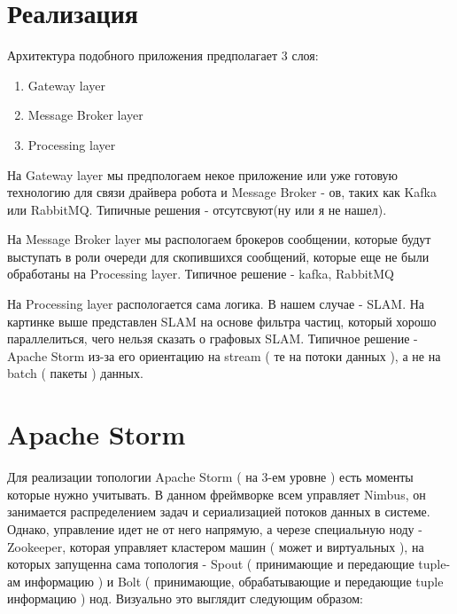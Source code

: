 \documentclass[a4paper, 14pt]{extreport}
\begin{document}
\chapter{Реализация}
\par Архитектура подобного приложения предполагает 3 слоя:
\begin{enumerate}
        \item Gateway layer
        \item Message Broker layer
        \item Processing layer
\end{enumerate}
\par На Gateway layer мы предпологаем некое приложение или уже готовую технологию для связи драйвера робота и Message Broker - ов, таких как Kafka или RabbitMQ. Типичные решения - отсутсвуют(ну или я не нашел).
\par На Message Broker layer мы распологаем брокеров сообщении, которые будут выступать в роли очереди для скопившихся сообщений, которые еще не были обработаны на Processing layer. Типичное решение - kafka, RabbitMQ
\par На Processing layer распологается сама логика. В нашем случае - SLAM. На картинке выше представлен SLAM на основе фильтра частиц, который хорошо параллелиться, чего нельзя сказать о графовых SLAM. Типичное решение - Apache Storm из-за его ориентацию на stream ( те на потоки данных ), а не на batch ( пакеты ) данных.
\chapter{Apache Storm}
\par Для реализации топологии Apache Storm ( на 3-ем уровне ) есть моменты которые нужно учитывать. В данном фреймворке всем управляет Nimbus, он занимается распределением задач и сериализацией потоков данных в системе. Однако, управление идет не от него напрямую, а черезе специальную ноду - Zookeeper, которая управляет кластером машин ( может и виртуальных ), на которых запущенна сама топология - Spout ( принимающие и передающие tuple-ам информацию ) и Bolt ( принимающие, обрабатывающие и передающие tuple информацию ) нод. Визуально это выглядит следующим образом:
\end{document}
